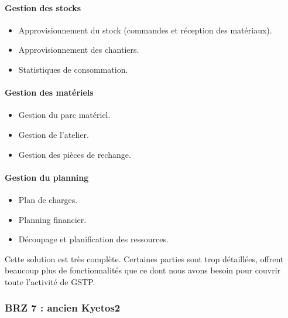                                 \paragraph{Gestion des stocks}
                                \begin{itemize}
                                    \item Approvisionnement du stock (commandes et réception des matériaux).
                                    \item Approvisionnement des chantiers.
                                    \item Statistiques de consommation.
                                \end{itemize}

                                \paragraph{Gestion des matériels}
                                \begin{itemize}
                                    \item Gestion du parc matériel.
                                    \item Gestion de l'atelier.
                                    \item Gestion des pièces de rechange.
                                \end{itemize}

                                \paragraph{Gestion du planning}
                                \begin{itemize}
                                    \item Plan de charges.
                                    \item Planning financier.
                                    \item Découpage et planification des ressources.
                                \end{itemize}

                Cette solution est très complète. Certaines parties sont trop détaillées, offrent beaucoup plus de fonctionnalités que ce dont nous avons besoin pour couvrir toute l'activité de GSTP.

                \subsubsection{BRZ 7 : ancien Kyetos2}

